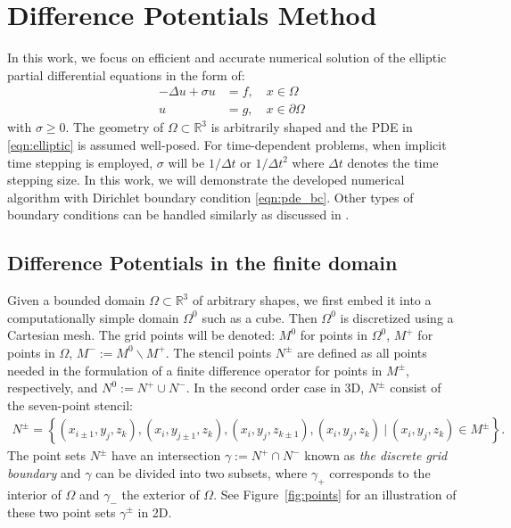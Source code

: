 \section{Difference Potentials Method}\label{sec:dpm}

In this work, we focus on efficient and accurate numerical solution of the elliptic partial differential equations in the form of:
\begin{subequations}\label{eqn:elliptic}
\begin{align}
-\Delta u +\sigma u &= f,\quad x\in\Omega\label{eqn:pde}\\
u &= g,\quad x\in\partial\Omega\label{eqn:pde_bc}
\end{align}
\end{subequations}
with $\sigma\geq0$. The geometry of $\Omega\subset\mathbb{R}^3$ is arbitrarily shaped and the PDE in \eqref{eqn:elliptic} is assumed well-posed. For time-dependent problems, when implicit time stepping is employed, $\sigma$ will be $1/\Delta t$ or $1/\Delta t^2$ where $\Delta t$ denotes the time stepping size. In this work, we will demonstrate the developed numerical algorithm with Dirichlet boundary condition \eqref{eqn:pde_bc}. Other types of boundary conditions can be handled similarly as discussed in \cite{xia2023local}.

\subsection{Difference Potentials in the finite domain}

Given a bounded domain $\Omega\subset \mathbb{R}^3$ of arbitrary shapes, we first embed it into a computationally simple domain $\Omega^0$ such as a cube. Then $\Omega^0$ is discretized using a Cartesian mesh. The grid points will be denoted: $M^0$ for points in $\Omega^0$, $M^+$ for points in $\Omega$, $M^-:=M^0\backslash M^+$. The stencil points $N^\pm$ are defined as all points needed in the formulation of a finite difference operator for points in $M^\pm$, respectively, and $N^0:=N^+\cup N^-$. In the second order case in 3D, $N^\pm$ consist of the seven-point stencil:
\begin{align}
N^\pm = \left\{(x_{i\pm 1},y_j,z_k),(x_i,y_{j\pm1},z_k),(x_i,y_j,z_{k\pm1}),(x_i,y_j,z_k) \ \big \vert\  (x_i,y_j,z_k)\in M^\pm\right\}.
\end{align}
The point sets $N^\pm$ have an intersection $\gamma:=N^+\cap N^-$ known as \emph{the discrete grid boundary} and $\gamma$ can be divided into two subsets, where $\gamma_+$ corresponds to the interior of $\Omega$ and $\gamma_-$ the exterior of $\Omega$. See Figure~\ref{fig:points} for an illustration of these two point sets $\gamma^\pm$ in 2D.

